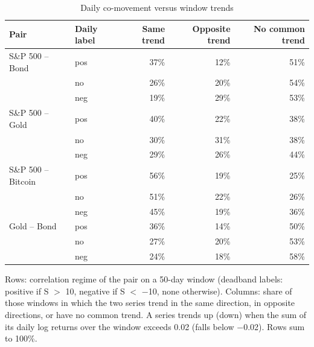 \begin{table}[t]
\centering
\scriptsize
\caption{Daily co-movement versus window trends}
\label{tab:tab_scale}
\begin{tabular}{llrrr}
\toprule
Pair & Daily label & Same trend & Opposite trend & No common trend \\
\midrule
S\&P 500 – Bond & pos & 37\% & 12\% & 51\% \\
 & no & 26\% & 20\% & 54\% \\
 & neg & 19\% & 29\% & 53\% \\
S\&P 500 – Gold & pos & 40\% & 22\% & 38\% \\
 & no & 30\% & 31\% & 38\% \\
 & neg & 29\% & 26\% & 44\% \\
S\&P 500 – Bitcoin & pos & 56\% & 19\% & 25\% \\
 & no & 51\% & 22\% & 26\% \\
 & neg & 45\% & 19\% & 36\% \\
Gold – Bond & pos & 36\% & 14\% & 50\% \\
 & no & 27\% & 20\% & 53\% \\
 & neg & 24\% & 18\% & 58\% \\
\bottomrule
\end{tabular}
\par\smallskip
\parbox{\linewidth}{\footnotesize Rows: correlation regime of the pair on a 50-day window (deadband labels: positive if S $>$ 10, negative if S $<$ $-$10, none otherwise). Columns: share of those windows in which the two series trend in the same direction, in opposite directions, or have no common trend. A series trends up (down) when the sum of its daily log returns over the window exceeds 0.02 (falls below $-$0.02). Rows sum to 100\%.}
\end{table}
